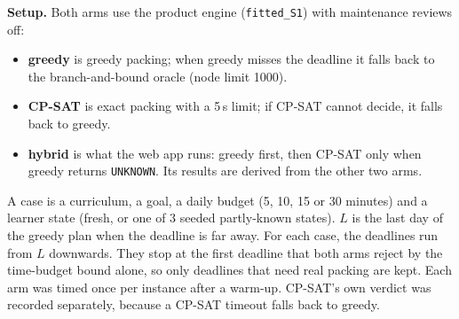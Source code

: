 \documentclass[11pt,a4paper]{article}
\begin{document}
\textbf{Setup.} Both arms use the product engine (\texttt{fitted\_S1}) with maintenance reviews off:
\begin{itemize}
\item \textbf{greedy} is greedy packing; when greedy misses the deadline it falls back to the branch-and-bound oracle (node limit 1000).
\item \textbf{CP-SAT} is exact packing with a 5\,s limit; if CP-SAT cannot decide, it falls back to greedy.
\item \textbf{hybrid} is what the web app runs: greedy first, then CP-SAT only when greedy returns \texttt{UNKNOWN}. Its results are derived from the other two arms.
\end{itemize}
A case is a curriculum, a goal, a daily budget (5, 10, 15 or 30 minutes) and a learner state (fresh, or one of 3 seeded partly-known states). $L$ is the last day of the greedy plan when the deadline is far away. For each case, the deadlines run from $L$ downwards. They stop at the first deadline that both arms reject by the time-budget bound alone, so only deadlines that need real packing are kept. Each arm was timed once per instance after a warm-up. CP-SAT's own verdict was recorded separately, because a CP-SAT timeout falls back to greedy.
\end{document}
